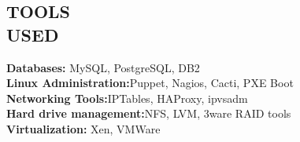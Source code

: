 \documentclass[10pt,line,margin]{res}
\begin{document}
\begin{resume}
\section{TOOLS \\ USED}
    {\bf Databases:} MySQL, PostgreSQL, DB2 \\
    {\bf Linux Administration:}Puppet, Nagios, Cacti, PXE Boot \\
    {\bf Networking Tools:}IPTables, HAProxy, ipvsadm \\
    {\bf Hard drive management:}NFS, LVM, 3ware RAID tools \\
    {\bf Virtualization:} Xen, VMWare \\

\end{resume}
\end{document}
